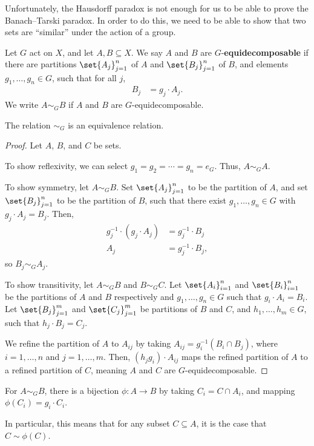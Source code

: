 Unfortunately, the Hausdorff paradox is not enough for us to be able to prove the Banach--Tarski paradox. In order to do this, we need to be able to show that two sets are ``similar'' under the action of a group.
\begin{definition}
  Let $G$ act on $X$, and let $A,B\subseteq X$. We say $A$ and $B$ are $G$-\textbf{equidecomposable} if there are partitions $\set{A_j}_{j=1}^{n}$ of $A$ and $\set{B_j}_{j=1}^{n}$ of $B$, and elements $g_1,\dots,g_n\in G$, such that for all $j$,
  \begin{align*}
    B_j &= g_j\cdot A_j.
  \end{align*}
  We write $A\sim_{G}B$ if $A$ and $B$ are $G$-equidecomposable.
\end{definition}
\begin{fact}
  The relation $\sim_{G}$ is an equivalence relation.
\end{fact}
\begin{proof}
  Let $A$, $B$, and $C$ be sets.\newline

  To show reflexivity, we can select $g_1 = g_2 = \cdots = g_n = e_G$. Thus, $A\sim_{G}A$.\newline

  To show symmetry, let $A\sim_{G} B$. Set $\set{A_j}_{j=1}^{n}$ to be the partition of $A$, and set $\set{B_j}_{j=1}^{n}$ to be the partition of $B$, such that there exist $g_1,\dots,g_n\in G$ with $g_j\cdot A_j = B_j$. Then,
  \begin{align*}
    g_j^{-1}\cdot \left(g_j\cdot A_j\right) &= g_j^{-1}\cdot B_j\\
    A_j &= g_j^{-1}\cdot B_j,
  \end{align*}
  so $B_j\sim_{G}A_j$.\newline

  To show transitivity, let $A\sim_{G} B$ and $B\sim_{G} C$. Let $\set{A_i}_{i=1}^{n}$ and $\set{B_i}_{i=1}^{n}$ be the partitions of $A$ and $B$ respectively and $g_1,\dots,g_n\in G$ such that $g_i\cdot A_i = B_i$. Let $\set{B_j}_{j=1}^{m}$ and $\set{C_j}_{j=1}^{m}$ be partitions of $B$ and $C$, and $h_1,\dots,h_m\in G$, such that $h_j\cdot B_j = C_j$.\newline

  We refine the partition of $A$ to $A_{ij}$ by taking $A_{ij} = g_i^{-1}\left(B_{i}\cap B_j\right)$, where $i = 1,\dots,n$ and $j = 1,\dots,m$. Then, $\left(h_jg_i\right)\cdot A_{ij}$ maps the refined partition of $A$ to a refined partition of $C$, meaning $A$ and $C$ are $G$-equidecomposable.
\end{proof}
\begin{fact}\label{fact:bijections}
  For $A\sim_{G} B$, there is a bijection $\phi: A\rightarrow B$ by taking $C_{i} = C\cap A_i$, and mapping $\phi\left(C_i\right) = g_i\cdot C_i$.\newline

  In particular, this means that for any subset $C\subseteq A$, it is the case that $C\sim \phi(C)$.
\end{fact}


